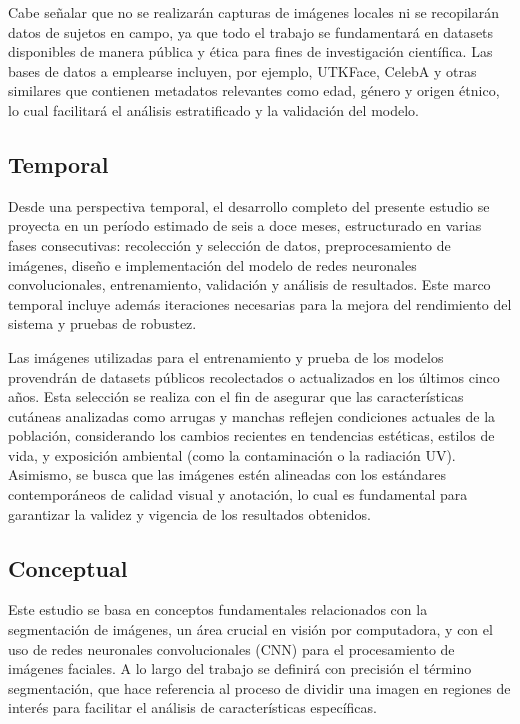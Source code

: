 Cabe señalar que no se realizarán capturas de imágenes locales ni se recopilarán datos de sujetos en campo, ya que todo el trabajo se fundamentará en datasets disponibles de manera pública y ética para fines de investigación científica. Las bases de datos a emplearse incluyen, por ejemplo, UTKFace, CelebA y otras similares que contienen metadatos relevantes como edad, género y origen étnico, lo cual facilitará el análisis estratificado y la validación del modelo.

\subsection{Temporal}

Desde una perspectiva temporal, el desarrollo completo del presente estudio se proyecta en un período estimado de seis a doce meses, estructurado en varias fases consecutivas: recolección y selección de datos, preprocesamiento de imágenes, diseño e implementación del modelo de redes neuronales convolucionales, entrenamiento, validación y análisis de resultados. Este marco temporal incluye además iteraciones necesarias para la mejora del rendimiento del sistema y pruebas de robustez.

Las imágenes utilizadas para el entrenamiento y prueba de los modelos provendrán de datasets públicos recolectados o actualizados en los últimos cinco años. Esta selección se realiza con el fin de asegurar que las características cutáneas analizadas como arrugas y manchas reflejen condiciones actuales de la población, considerando los cambios recientes en tendencias estéticas, estilos de vida, y exposición ambiental (como la contaminación o la radiación UV). Asimismo, se busca que las imágenes estén alineadas con los estándares contemporáneos de calidad visual y anotación, lo cual es fundamental para garantizar la validez y vigencia de los resultados obtenidos.

\subsection{Conceptual}

Este estudio se basa en conceptos fundamentales relacionados con la segmentación de imágenes, un área crucial en visión por computadora, y con el uso de redes neuronales convolucionales (CNN) para el procesamiento de imágenes faciales. A lo largo del trabajo se definirá con precisión el término segmentación, que hace referencia al proceso de dividir una imagen en regiones de interés para facilitar el análisis de características específicas.

